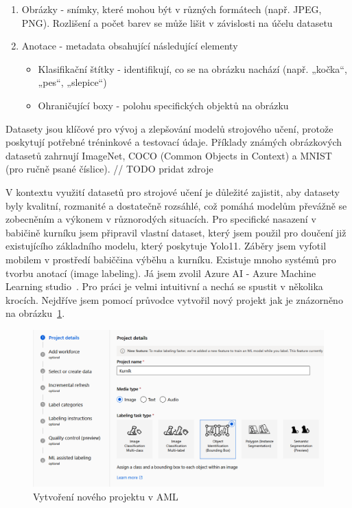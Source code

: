 \begin{enumerate}
    \item Obrázky - snímky, které mohou být v různých formátech (např. JPEG, PNG). Rozlišení a počet barev se může lišit v závislosti na účelu datasetu
    \item Anotace - metadata obsahující následující elementy
    \begin{itemize}
        \item Klasifikační štítky - identifikují, co se na obrázku nachází (např. „kočka“, „pes“, „slepice“)
        \item Ohraničující boxy - polohu specifických objektů na obrázku
    \end{itemize}
\end{enumerate}

Datasety jsou klíčové pro vývoj a zlepšování modelů strojového učení, protože poskytují potřebné tréninkové a testovací údaje.
Příklady známých obrázkových datasetů zahrnují ImageNet, COCO (Common Objects in Context) a MNIST (pro ručně psané číslice).  // TODO pridat zdroje

V kontextu využití datasetů pro strojové učení je důležité zajistit, aby datasety byly kvalitní, rozmanité a dostatečně rozsáhlé, což pomáhá modelům převážně se zobecněním a výkonem v různorodých situacích.
Pro specifické nasazení v babičině kurníku jsem připravil vlastní dataset, který jsem použil pro doučení již existujícího základního modelu, který poskytuje Yolo11.
Záběry jsem vyfotil mobilem v prostředí babiččina výběhu a kurníku.
Existuje mnoho systémů pro tvorbu anotací (image labeling).
Já jsem zvolil Azure AI - Azure Machine Learning studio~\cite{aml}.
Pro práci je velmi intuitivní a nechá se spustit v několika krocích.
Nejdříve jsem pomocí průvodce vytvořil nový projekt jak je znázorněno na obrázku~\ref{fig:create_learning_project}.

\begin{figure}[htbp]
    \centering
    \includegraphics[width=1.0\textwidth]{img/create_learning_project}
    \caption{Vytvoření nového projektu v AML}
    \label{fig:create_learning_project}
\end{figure}


